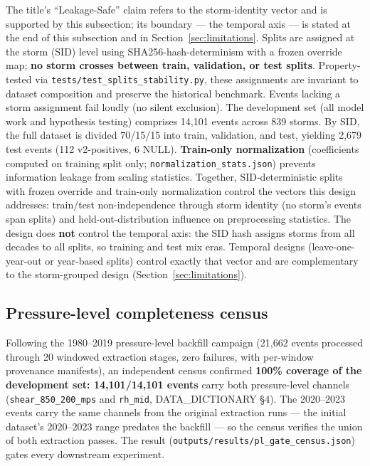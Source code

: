\documentclass[11pt]{article}
\begin{document}
The title's ``Leakage-Safe'' claim refers to the storm-identity vector and is
supported by this subsection; its boundary --- the temporal axis --- is stated
at the end of this subsection and in Section~\ref{sec:limitations}. Splits are
assigned at the storm (SID) level using SHA256-hash-determinism with a frozen
override map; \textbf{no storm crosses between train, validation, or test
splits}. Property-tested via \texttt{tests/test\_splits\_stability.py}, these
assignments are invariant to dataset composition and preserve the historical
benchmark. Events lacking a storm assignment fail loudly (no silent exclusion).
The development set (all model work and hypothesis testing) comprises 14{,}101
events across 839 storms. By SID, the full dataset is divided 70/15/15 into
train, validation, and test, yielding 2{,}679 test events (112 v2-positives, 6
NULL). \textbf{Train-only normalization} (coefficients computed on training
split only; \texttt{normalization\_stats.json}) prevents information leakage
from scaling statistics. Together, SID-deterministic splits with frozen
override and train-only normalization control the vectors this design
addresses: train/test non-independence through storm identity (no storm's
events span splits) and held-out-distribution influence on preprocessing
statistics. The design does \textbf{not} control the temporal axis: the SID
hash assigns storms from all decades to all splits, so training and test mix
eras. Temporal designs (leave-one-year-out or year-based splits) control
exactly that vector and are complementary to the storm-grouped design
(Section~\ref{sec:limitations}).

\subsection{Pressure-level completeness census}

Following the 1980--2019 pressure-level backfill campaign (21{,}662 events
processed through 20 windowed extraction stages, zero failures, with
per-window provenance manifests), an independent census confirmed \textbf{100\%
coverage of the development set: 14{,}101/14{,}101 events} carry both
pressure-level channels (\texttt{shear\_850\_200\_mps} and \texttt{rh\_mid},
DATA\_DICTIONARY \S4). The 2020--2023 events carry the same channels from the
original extraction runs --- the initial dataset's 2020--2023 range predates
the backfill --- so the census verifies the union of both extraction passes.
The result
(\texttt{outputs/results/pl\_gate\_census.json}) gates every downstream
experiment.
\end{document}
